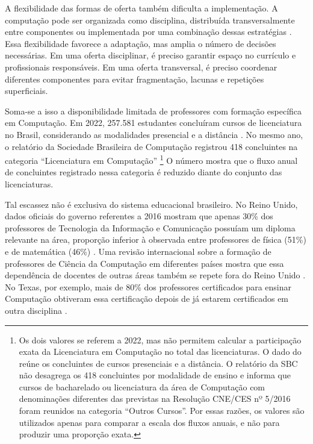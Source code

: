 A flexibilidade das formas de oferta também dificulta a implementação. A computação pode ser organizada como disciplina, distribuída transversalmente entre componentes ou implementada por uma combinação dessas estratégias \cite{brasil2025resolucao2}. Essa flexibilidade favorece a adaptação, mas amplia o número de decisões necessárias. Em uma oferta disciplinar, é preciso garantir espaço no currículo e profissionais responsáveis. Em uma oferta transversal, é preciso coordenar diferentes componentes para evitar fragmentação, lacunas e repetições superficiais.

Soma-se a isso a disponibilidade limitada de professores com formação específica em Computação. Em 2022, 257.581 estudantes concluíram cursos de licenciatura no Brasil, considerando as modalidades presencial e a distância \cite{inep2024resumotecnico2022}. No mesmo ano, o relatório da Sociedade Brasileira de Computação registrou 418 concluintes na categoria ``Licenciatura em Computação'' \cite{sbc2022estatisticas}\footnote{Os dois valores se referem a 2022, mas não permitem calcular a participação exata da Licenciatura em Computação no total das licenciaturas. O dado do  reúne os concluintes de cursos presenciais e a distância. O relatório da SBC não desagrega os 418 concluintes por modalidade de ensino e informa que cursos de bacharelado ou licenciatura da área de Computação com denominações diferentes das previstas na Resolução CNE/CES nº 5/2016 foram reunidos na categoria ``Outros Cursos''. Por essas razões, os valores são utilizados apenas para comparar a escala dos fluxos anuais, e não para produzir uma proporção exata.} O número mostra que o fluxo anual de concluintes registrado nessa categoria é reduzido diante do conjunto das licenciaturas.

Tal escassez não é exclusiva do sistema educacional brasileiro. No Reino Unido, dados oficiais do governo referentes a 2016 mostram que apenas 30\% dos professores de Tecnologia da Informação e Comunicação possuíam um diploma relevante na área, proporção inferior à observada entre professores de física (51\%) e de matemática (46\%) \cite{royal2017afterreboot}. Uma revisão internacional sobre a formação de professores de Ciência da Computação em diferentes países mostra que essa dependência de docentes de outras áreas também se repete fora do Reino Unido \cite{yadav2022review}. No Texas, por exemplo, mais de 80\% dos professores certificados para ensinar Computação obtiveram essa certificação depois de já estarem certificados em outra disciplina \cite{yadav2022review}.

